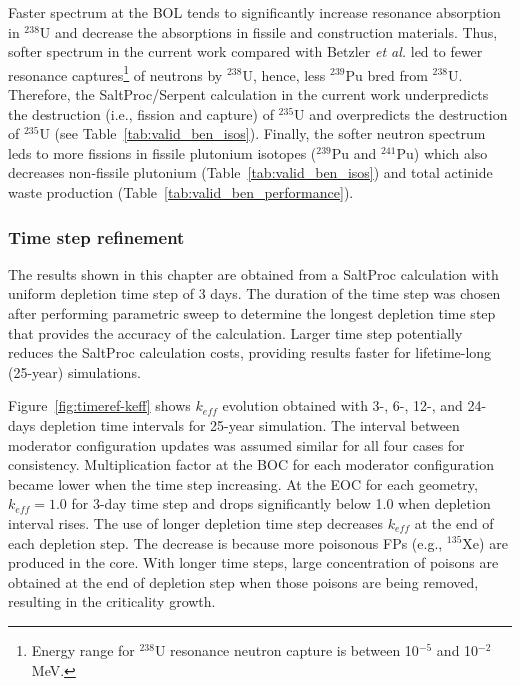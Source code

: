 Faster spectrum at the \gls{BOL} tends to significantly increase resonance 
absorption
in $^{238}$U and decrease the absorptions in fissile and 
construction materials. Thus, softer spectrum in the current work compared 
with Betzler \emph{et al.} led to fewer resonance captures\footnote{Energy 
range for $^{238}$U resonance neutron capture is between 10$^{-5}$ and 
10$^{-2}$ MeV.} of neutrons by $^{238}$U, hence, less $^{239}$Pu bred from 
$^{238}$U. Therefore, the SaltProc/Serpent calculation in the current work 
underpredicts the destruction (i.e., fission and capture) of $^{235}$U and 
overpredicts the destruction of $^{235}$U (see Table~\ref{tab:valid_ben_isos}). 
Finally, the softer neutron spectrum leds to more fissions in fissile 
plutonium isotopes ($^{239}$Pu and $^{241}$Pu) which also decreases 
non-fissile plutonium (Table~\ref{tab:valid_ben_isos}) and total actinide 
waste production (Table~\ref{tab:valid_ben_performance}).


\subsubsection{Time step refinement}
The results shown in this chapter are obtained from a SaltProc calculation 
with uniform depletion time step of 3 days. The duration of the time step was 
chosen after performing parametric sweep to determine the longest depletion 
time step that provides the accuracy of the calculation. Larger time step 
potentially reduces the SaltProc calculation costs, providing results faster 
for lifetime-long (25-year) simulations. 

Figure~\ref{fig:timeref-keff} shows $k_{eff}$ evolution obtained with 3-, 6-, 
12-, and 24-days depletion time intervals for 25-year simulation. The interval 
between moderator configuration updates was assumed similar for all four cases 
for consistency. Multiplication factor at the \gls{BOC} for each moderator 
configuration became lower when the time step increasing. At the \gls{EOC} for 
each geometry, $k_{eff}=1.0$  for 3-day time step and drops significantly below 
1.0 when depletion interval rises. The use of longer depletion time step 
decreases $k_{eff}$ at the end of each depletion step. The decrease is because 
more poisonous \glspl{FP} (e.g., $^{135}$Xe) are produced in the core. With 
longer time steps, large concentration of poisons are obtained at the end of 
depletion step when those poisons are being removed, resulting in the 
criticality growth. 

